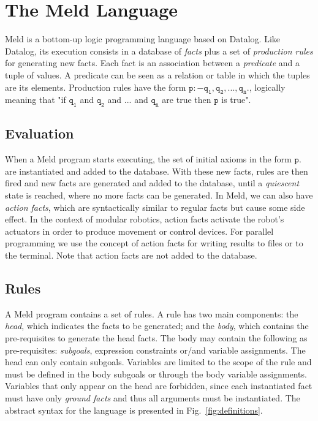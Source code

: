 \documentclass[preprint]{sigplanconf}
\begin{document}
\section{The Meld Language}

Meld is a bottom-up logic programming language based on Datalog. Like Datalog, its
execution consists in a database of \emph{facts} plus a set of \emph{production rules} for generating new facts.
Each fact is an association between a \emph{predicate} and a tuple of values. A predicate can be seen
as a relation or table in which the tuples are its elements. Production rules have the form
$\mathtt{p :- q_1, q_2, ..., q_n.}$, logically meaning that "if $\mathtt{q_1}$ and $\mathtt{q_2}$ and ... and
$\mathtt{q_n}$ are true then $\mathtt{p}$ is true".

\subsection{Evaluation}

When a Meld program starts executing, the set of initial axioms in the form $\mathtt{p.}$ are
instantiated and added to the database. With these new facts, rules are then fired and new
facts are generated and added to the database, until a \emph{quiescent} state is reached, where
no more facts can be generated. In Meld, we can also have \emph{action facts},
which are syntactically similar to regular facts but cause some side effect. In the context of
modular robotics, action facts activate the robot's actuators in order to produce movement
or control devices. For parallel programming we use the concept of action facts for writing
results to files or to the terminal. Note that action facts are not added to the database.

\subsection{Rules}

A Meld program contains a set of rules. A rule has two main components: the \emph{head},
which indicates the facts to be generated; and the \emph{body}, which contains the pre-requisites
to generate the head facts. The body may contain the following as pre-requisites: \emph{subgoals},
expression constraints or/and variable assignments. The head can only contain subgoals.
Variables are limited to the scope of the rule and must be defined in the body subgoals or through
the body variable assignments. Variables that only appear on the head are forbidden, since each
instantiated fact must have only \emph{ground facts} and thus all arguments must be instantiated.
The abstract syntax for the language is presented in Fig.~\ref{fig:definitions}.
\end{document}
